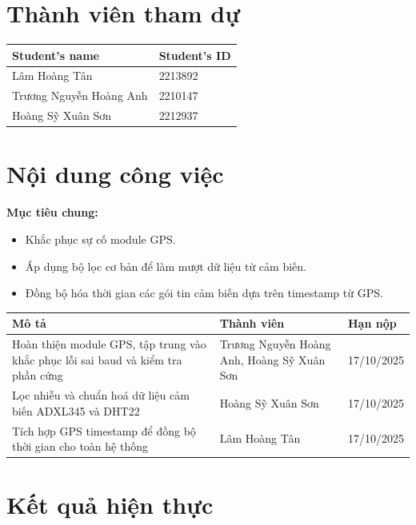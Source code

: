 \section{Thành viên tham dự}
\begin{table}[H]
\centering
\begin{tabular}{|l|l|}
\hline
\textbf{Student’s name} & \textbf{Student’s ID} \\ \hline
Lâm Hoàng Tân           & 2213892                \\ \hline
Trương Nguyễn Hoàng Anh & 2210147                \\ \hline
Hoàng Sỹ Xuân Sơn       & 2212937                \\ \hline
\end{tabular}
\end{table}

\section{Nội dung công việc} 
\textbf{Mục tiêu chung:} 
\begin{itemize} 
\item Khắc phục sự cố module GPS. 
\item Áp dụng bộ lọc cơ bản để làm mượt dữ liệu từ cảm biến. 
\item Đồng bộ hóa thời gian các gói tin cảm biến dựa trên timestamp từ GPS. 
\end{itemize}

\begin{table}[H]
\centering
\begin{tabular}{|p{7cm}|p{4cm}|p{3cm}|}
\hline
\textbf{Mô tả} & \textbf{Thành viên} & \textbf{Hạn nộp} \\ 
\hline
Hoàn thiện module GPS, tập trung vào khắc phục lỗi sai baud và kiểm tra phần cứng 
& Trương Nguyễn Hoàng Anh, Hoàng Sỹ Xuân Sơn
& 17/10/2025 \\ 
\hline
Lọc nhiễu và chuẩn hoá dữ liệu cảm biến ADXL345 và DHT22 
& Hoàng Sỹ Xuân Sơn
& 17/10/2025 \\ 
\hline
Tích hợp GPS timestamp để đồng bộ thời gian cho toàn hệ thống 
& Lâm Hoàng Tân 
& 17/10/2025 \\ 
\hline
\end{tabular}
\end{table}


\section{Kết quả hiện thực}
